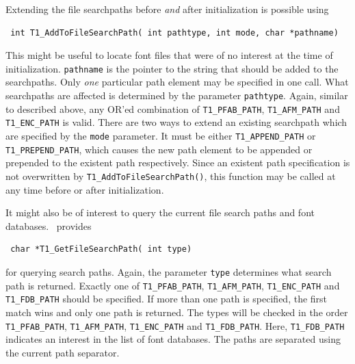 Extending the file searchpaths before {\em and} after initialization
is possible using 
\precorr
\begin{verbatim}
 int T1_AddToFileSearchPath( int pathtype, int mode, char *pathname)
\end{verbatim}\postcorr
This might be useful to locate font files that were of no interest
at the time of initialization. 
\verb+pathname+ is the pointer to the string that should be added to the
searchpaths. Only {\em one} particular path element may be specified in one
call. What searchpaths are affected is determined by the parameter
\verb+pathtype+. Again, similar to described above, any
OR'ed combination of \verb+T1_PFAB_PATH+, \verb+T1_AFM_PATH+ and
\verb+T1_ENC_PATH+ is valid. There are two ways to extend an existing
searchpath which are specified by the \verb+mode+ parameter. It must be either
\verb+T1_APPEND_PATH+ or \verb+T1_PREPEND_PATH+, which causes the new path
element to be appended or prepended to the existent path respectively.
Since an existent path specification is not overwritten by
\verb+T1_AddToFileSearchPath()+, this function may be called at any time
before or after initialization.

It might also be of interest to query the current file search
paths and font databases. \tonelib\ provides 
\precorr
\begin{verbatim}
 char *T1_GetFileSearchPath( int type)
\end{verbatim}\postcorr 
for querying search paths. Again, the parameter \verb+type+ determines what
search path is returned. Exactly one of \verb+T1_PFAB_PATH+,
\verb+T1_AFM_PATH+, \verb+T1_ENC_PATH+ and \verb+T1_FDB_PATH+ should be
specified. If more than one path is specified, the first match wins and only
one path is returned. The types will be checked in the order
\verb+T1_PFAB_PATH+, \verb+T1_AFM_PATH+, \verb+T1_ENC_PATH+ and
\verb+T1_FDB_PATH+. Here, \verb+T1_FDB_PATH+ indicates an interest in the list
of font databases. The paths are separated using the current path separator. 


